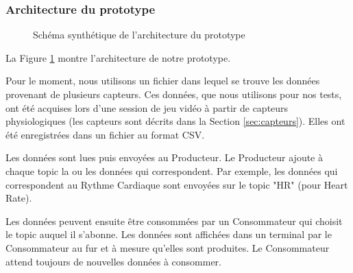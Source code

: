 \documentclass[11pt]{article}
\begin{document}
		\subsubsection{Architecture du prototype}\label{sec:protoarchi}
			\begin{figure}
				\centering
				\caption{Schéma synthétique de l'architecture du prototype}
				\label{fig:archiproto}
			\end{figure}
			La Figure \ref{fig:archiproto} montre l'architecture de notre prototype.\par
			Pour le moment, nous utilisons un fichier dans lequel se trouve les données provenant de plusieurs capteurs.
			Ces données, que nous utilisons pour nos tests, ont été acquises lors d'une session de jeu vidéo à partir de capteurs physiologiques (les capteurs sont décrits dans la Section \ref{sec:capteurs}). 
			Elles ont été enregistrées dans un fichier au format CSV.\par
			Les données sont lues puis envoyées au Producteur.
			Le Producteur ajoute à chaque topic la ou les données qui correspondent.
			Par exemple, les données qui correspondent au Rythme Cardiaque sont envoyées sur le topic "HR" (pour Heart Rate).\par
			Les données peuvent ensuite être consommées par un Consommateur qui choisit le topic auquel il s'abonne.
			Les données sont affichées dans un terminal par le Consommateur au fur et à mesure qu'elles sont produites.
			Le Consommateur attend toujours de nouvelles données à consommer.
\end{document}
